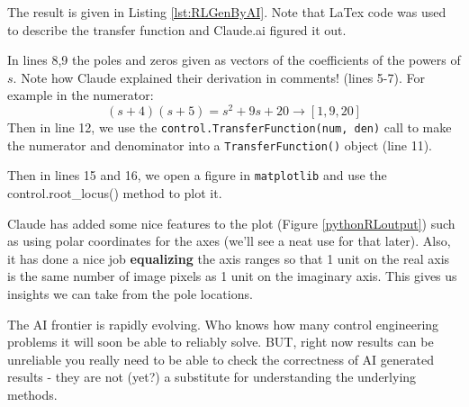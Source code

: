 The result is given in Listing \ref{lst:RLGenByAI}.
Note that LaTex code was used to describe the transfer function and Claude.ai figured it out.

In lines 8,9 the poles and zeros given as vectors of the coefficients of the powers of $s$.
Note how Claude explained their
derivation in comments! (lines 5-7).  For example in the
numerator:
\[
(s+4)(s+5) = s^2 + 9s + 20 \to [1, 9, 20]
\]
Then in line 12,
we use the {\tt control.TransferFunction(num, den)}  call to make the numerator and denominator into
a {\tt TransferFunction()} object (line 11).

Then in lines 15 and 16, we open a figure in {\tt matplotlib} and use the {control.root\_locus()} method to plot it.


Claude has added some nice features to the plot (Figure \ref{pythonRLoutput})
such as using polar coordinates
for the axes (we'll see a neat use for that later).   Also, it has done a nice job
{\bf equalizing} the axis ranges so that 1 unit on the real axis is the same number
    of image pixels as 1 unit on the imaginary axis.  This gives us insights we can
    take from the pole locations.

The AI frontier is rapidly evolving.  Who knows how many control engineering problems it will soon be able
to reliably solve.  BUT, right now results can be unreliable you really need to be able to check the correctness
of AI generated results - they are not (yet?) a substitute for understanding the underlying methods.

%
%
%


